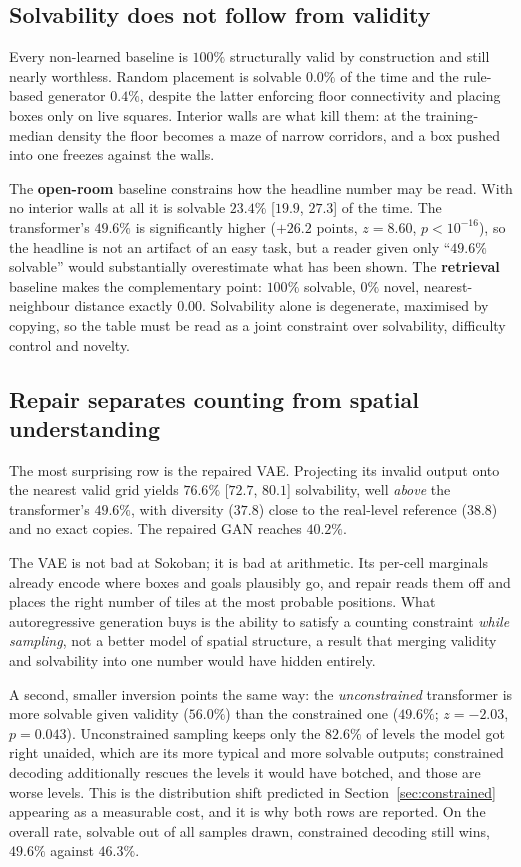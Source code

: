 \documentclass[conference]{IEEEtran}
\begin{document}
\subsection{Solvability does not follow from validity}
Every non-learned baseline is $100\%$ structurally valid by construction and
still nearly worthless. Random placement is solvable $0.0\%$ of the time and the
rule-based generator $0.4\%$, despite the latter enforcing floor connectivity
and placing boxes only on live squares. Interior walls are what kill them: at
the training-median density the floor becomes a maze of narrow corridors, and a
box pushed into one freezes against the walls.

The \textbf{open-room} baseline constrains how the headline number may be read.
With no interior walls at all it is solvable $23.4\%$ [$19.9$, $27.3$] of the
time. The transformer's $49.6\%$ is significantly higher ($+26.2$ points,
$z = 8.60$, $p < 10^{-16}$), so the headline is not an artifact of an easy task,
but a reader given only ``$49.6\%$ solvable'' would substantially
overestimate what has been shown. The \textbf{retrieval} baseline makes the
complementary point: $100\%$ solvable, $0\%$ novel, nearest-neighbour distance
exactly $0.00$. Solvability alone is degenerate, maximised by copying, so the
table must be read as a joint constraint over solvability, difficulty control
and novelty.

\subsection{Repair separates counting from spatial understanding}
The most surprising row is the repaired VAE. Projecting its invalid output onto
the nearest valid grid yields $76.6\%$ [$72.7$, $80.1$] solvability, well
\emph{above} the transformer's $49.6\%$, with diversity ($37.8$) close to the
real-level reference ($38.8$) and no exact copies. The repaired GAN reaches
$40.2\%$.

The VAE is not bad at Sokoban; it is bad at arithmetic. Its per-cell marginals
already encode where boxes and goals plausibly go, and repair reads them off and
places the right number of tiles at the most probable positions. What
autoregressive generation buys is the ability to satisfy a counting constraint
\emph{while sampling}, not a better model of spatial structure, a result that
merging validity and solvability into one number would have hidden entirely.

A second, smaller inversion points the same way: the \emph{unconstrained}
transformer is more solvable given validity ($56.0\%$) than the constrained one
($49.6\%$; $z = -2.03$, $p = 0.043$). Unconstrained sampling keeps only the
$82.6\%$ of levels the model got right unaided, which are its more typical and
more solvable outputs; constrained decoding additionally rescues the levels it
would have botched, and those are worse levels. This is the distribution shift
predicted in Section~\ref{sec:constrained} appearing as a measurable cost, and
it is why both rows are reported. On the overall rate, solvable out of all
samples drawn, constrained decoding still wins, $49.6\%$ against $46.3\%$.
\end{document}
